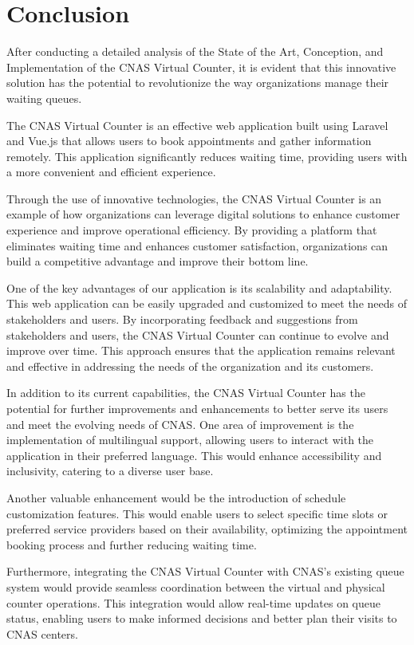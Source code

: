 \chapter*{Conclusion}
After conducting a detailed analysis of the State of the Art, Conception, and Implementation of the CNAS Virtual Counter, it is evident that this innovative solution has the potential to revolutionize the way organizations manage their waiting queues.

The CNAS Virtual Counter is an effective web application built using Laravel and Vue.js that allows users to book appointments and gather information remotely. This application significantly reduces waiting time, providing users with a more convenient and efficient experience.

Through the use of innovative technologies, the CNAS Virtual Counter is an example of how organizations can leverage digital solutions to enhance customer experience and improve operational efficiency. By providing a platform that eliminates waiting time and enhances customer satisfaction, organizations can build a competitive advantage and improve their bottom line.

One of the key advantages of our application is its scalability and adaptability. This web application can be easily upgraded and customized to meet the needs of stakeholders and users. By incorporating feedback and suggestions from stakeholders and users, the CNAS Virtual Counter can continue to evolve and improve over time. This approach ensures that the application remains relevant and effective in addressing the needs of the organization and its customers.

In addition to its current capabilities, the CNAS Virtual Counter has the potential for further improvements and enhancements to better serve its users and meet the evolving needs of CNAS. One area of improvement is the implementation of multilingual support, allowing users to interact with the application in their preferred language. This would enhance accessibility and inclusivity, catering to a diverse user base.

Another valuable enhancement would be the introduction of schedule customization features. This would enable users to select specific time slots or preferred service providers based on their availability, optimizing the appointment booking process and further reducing waiting time.

Furthermore, integrating the CNAS Virtual Counter with CNAS's existing queue system would provide seamless coordination between the virtual and physical counter operations. This integration would allow real-time updates on queue status, enabling users to make informed decisions and better plan their visits to CNAS centers.

